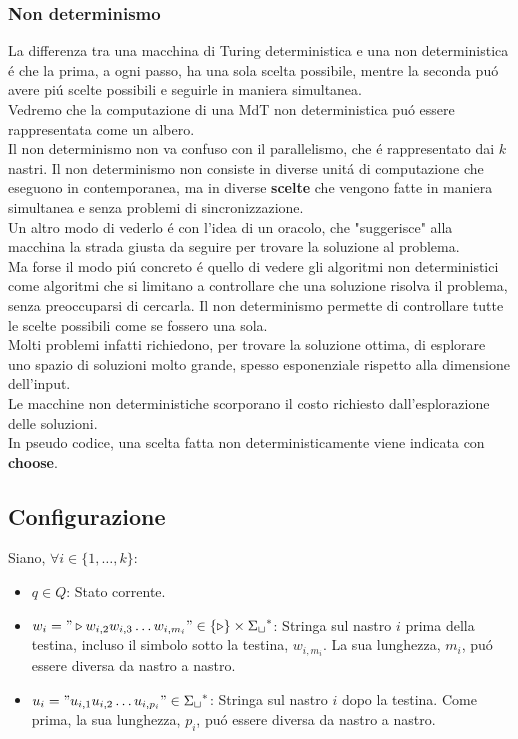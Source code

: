 \subsubsection{Non determinismo}
La differenza tra una macchina di Turing deterministica e una non deterministica 
é che la prima, a ogni passo, ha una sola scelta possibile, mentre la seconda puó 
avere piú scelte possibili e seguirle in maniera simultanea. \\
Vedremo che la computazione di una MdT non deterministica puó essere rappresentata 
come un albero. \\
Il non determinismo non va confuso con il parallelismo, che é rappresentato dai $k$ nastri. 
Il non determinismo non consiste in diverse unitá di computazione che eseguono in contemporanea,
ma in diverse \textbf{scelte} che vengono fatte in maniera simultanea e senza problemi di sincronizzazione. \\
Un altro modo di vederlo é con l'idea di un oracolo, che "suggerisce" alla macchina la strada
giusta da seguire per trovare la soluzione al problema. \\
Ma forse il modo piú concreto é quello di vedere gli algoritmi non deterministici come 
algoritmi che si limitano a controllare che una soluzione risolva il problema, 
senza preoccuparsi di cercarla. 
Il non determinismo permette di controllare tutte le scelte possibili come se fossero una sola. \\
Molti problemi infatti richiedono, per trovare la soluzione ottima, di esplorare uno spazio 
di soluzioni molto grande, spesso esponenziale rispetto alla dimensione dell'input. \\
Le macchine non deterministiche scorporano il costo richiesto dall'esplorazione delle soluzioni.\\
In pseudo codice, una scelta fatta non deterministicamente viene indicata con \textbf{choose}.


\subsection{Configurazione}
Siano, $\forall i \in \{1, \dots, k\}$:
\begin{itemize}
    \item $q \in Q$: Stato corrente.
    \item $w_i = "\triangleright w_{i,2} w_{i,3} \dots {w_{i,{m_i}}}" \in \{\triangleright\} \times {\Sigma_\sqcup}^*$: 
    Stringa sul nastro $i$ prima della testina, incluso il simbolo sotto la testina, $w_{i,m_i}$. La sua lunghezza, $m_i$, puó essere diversa da nastro a nastro.
    \item $u_i = "u_{i,1} u_{i,2} \dots u_{i,{p_i}}" \in {\Sigma_\sqcup}^*$: Stringa sul nastro $i$ dopo la testina. Come prima, la sua lunghezza, $p_i$, puó essere diversa da nastro a nastro.
\end{itemize}

